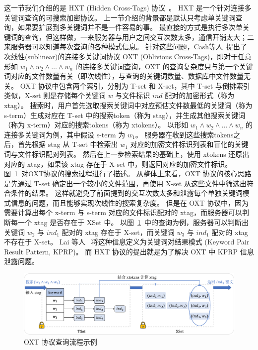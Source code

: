 这一节我们介绍的是 HXT (Hidden Cross-Tags) 协议~\cite{lai2018result}。
HXT 是一个针对连接多关键词查询的可搜索加密协议。
上一节介绍的背景都是默认只考虑单关键词查询，如果要扩展到多关键词并不是一件容易的事。
最直接的方式是执行多次单关键词的查询，但这样做，一来服务器与用户之间交互次数太多，通信开销太大；二来服务器可以知道每次查询的各种模式信息。
针对这些问题，Cash等人~\cite{cash2013highlyscalable}提出了次线性(sublinear)的连接多关键词协议 OXT (Oblivious Cross-Tags)，即对于任意形如 $w_1\land w_2 \land \dots \land w_n$ 的连接多关键词查询，OXT 的查询复杂度只与第一个关键词对应的文件数量有关（即次线性），与查询的关键词数量、数据库中文件数量无关。
OXT 协议中包含两个索引，分别为 T-set 和 X-set，其中 T-set 与倒排索引类似，X-set 则是存储每个关键词 $w$ 与文件标识 $ind$ 配对的加密形式（称为 xtag）。
搜索时，用户首先选取搜索关键词中对应预估文件数最低的关键词（称为 s-term）生成对应在 T-set 中的搜索token（称为 stag），并生成其他搜索关键词（称为 x-term）对应的搜索tokens（称为 xtokens）。
以形如 $w_1 \land w_2 \land \dots \land w_n$ 的连接多关键词为例，其中假设 s-term 为 $w_1$。
服务器在收到这些搜索tokens之后，首先根据 stag 从 T-set 中检索出 $w_1$ 对应的加密文件标识列表和盲化的关键词与文件标识配对列表。
然后在上一步检索结果的基础上，使用 xtokens 还原出对应的 xtag，如果该 xtag 存在于 X-set 中，则返回对应的加密文件标识。
图~\ref{fig:oxt_example}~对OXT协议的搜索过程进行了描述。
从整体上来看，OXT 协议的核心思路是先通过 T-set 确定出一个较小的文件范围，再使用 X-set 从这些文件中筛选出符合条件的结果。
这样就避免了前面提到的交互次数太多和泄露每个单独关键词模式信息的问题，而且能够实现次线性的搜索复杂度。
但是在 OXT 协议中，因为需要计算出每个 x-term 与 s-term 对应的文件标识配对的 xtag，而服务器可以判断每一个 xtag 是否存在于 XSet 中。
以图~\ref{fig:oxt_example}~中的查询为例，服务器可以判断出关键词 $w_2$ 与 $ind_1$ 配对的 xtag 存在于 X-set，而关键词 $w_3$ 与 $ind_1$ 配对的 xtag 不存在于 X-set。
Lai 等人~\cite{lai2018result} 将这种信息定义为关键词对结果模式 (Keyword Pair Result Pattern, KPRP)。
而 HXT 协议的提出就是为了解决 OXT 中 KPRP 信息泄露问题。
\begin{figure}[ht]
  \centering
  \includegraphics[width=\textwidth]{figures/OXT_exp.pdf}
  \caption{OXT 协议查询流程示例}
  \label{fig:oxt_example}
\end{figure}

